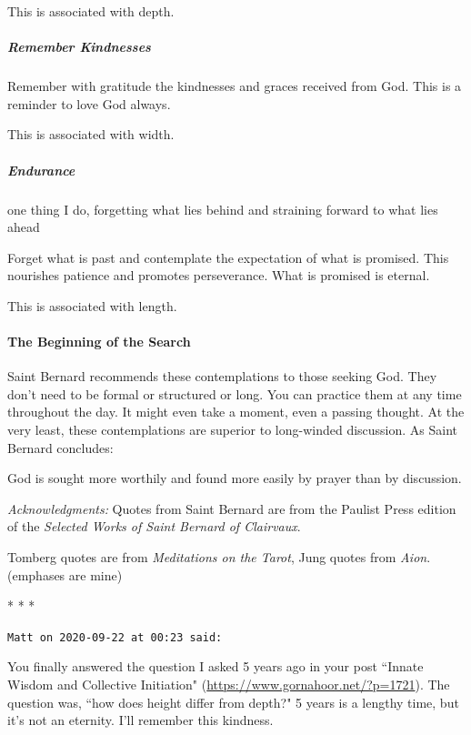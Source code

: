 This is associated with depth.

\subparagraph{Remember Kindnesses}
Remember with gratitude the kindnesses and graces received from God. This is a reminder to love God always.

This is associated with width.

\subparagraph{Endurance}
\begin{quotex}
one thing I do, forgetting what lies behind and straining forward to what lies ahead 

\end{quotex}
Forget what is past and contemplate the expectation of what is promised. This nourishes patience and promotes perseverance. What is promised is eternal.

This is associated with length.

\paragraph{The Beginning of the Search}
Saint Bernard recommends these contemplations to those seeking God. They don't need to be formal or structured or long. You can practice them at any time throughout the day. It might even take a moment, even a passing thought. At the very least, these contemplations are superior to long-winded discussion. As Saint Bernard concludes:

\begin{quotex}
God is sought more worthily and found more easily by prayer than by discussion. 

\end{quotex}


\textit{Acknowledgments:} Quotes from Saint Bernard are from the Paulist Press edition of the \emph{Selected Works of Saint Bernard of Clairvaux}.

Tomberg quotes are from \emph{Meditations on the Tarot}, Jung quotes from \emph{Aion}. (emphases are mine)


\begin{center}* * *\end{center}

\begin{footnotesize}\begin{sffamily}



\texttt{Matt on 2020-09-22 at 00:23 said: }

You finally answered the question I asked 5 years ago in your post ``Innate Wisdom and Collective Initiation" (\url{https://www.gornahoor.net/?p=1721}). The question was, ``how does height differ from depth?" 5 years is a lengthy time, but it's not an eternity. I'll remember this kindness.


\end{sffamily}\end{footnotesize}
